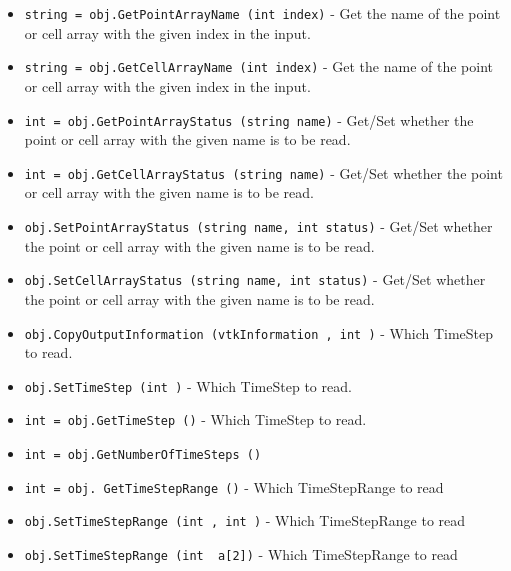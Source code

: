 \begin{itemize}
\item  \verb|string = obj.GetPointArrayName (int index)| -  Get the name of the point or cell array with the given index in
 the input.

\item  \verb|string = obj.GetCellArrayName (int index)| -  Get the name of the point or cell array with the given index in
 the input.

\item  \verb|int = obj.GetPointArrayStatus (string name)| -  Get/Set whether the point or cell array with the given name is to
 be read.

\item  \verb|int = obj.GetCellArrayStatus (string name)| -  Get/Set whether the point or cell array with the given name is to
 be read.

\item  \verb|obj.SetPointArrayStatus (string name, int status)| -  Get/Set whether the point or cell array with the given name is to
 be read.

\item  \verb|obj.SetCellArrayStatus (string name, int status)| -  Get/Set whether the point or cell array with the given name is to
 be read.

\item  \verb|obj.CopyOutputInformation (vtkInformation , int )| -  Which TimeStep to read.    

\item  \verb|obj.SetTimeStep (int )| -  Which TimeStep to read.    

\item  \verb|int = obj.GetTimeStep ()| -  Which TimeStep to read.    

\item  \verb|int = obj.GetNumberOfTimeSteps ()|

\item  \verb|int = obj. GetTimeStepRange ()| -  Which TimeStepRange to read

\item  \verb|obj.SetTimeStepRange (int , int )| -  Which TimeStepRange to read

\item  \verb|obj.SetTimeStepRange (int  a[2])| -  Which TimeStepRange to read

\end{itemize}
